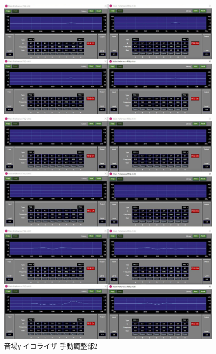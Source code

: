 \documentclass[11pt,a4j]{jreport}
\begin{document}
\begin{figure}[H]
  \begin{minipage}[b]{.5\linewidth}
    \centering
    \includegraphics[width=.9\linewidth]{images/experimentField/afcParameters/03gamma/05manualEQ8.jpg}
  \end{minipage}%
  \begin{minipage}[b]{.5\linewidth}
    \centering
    \includegraphics[width=.9\linewidth]{images/experimentField/afcParameters/03gamma/05manualEQ9.jpg}
  \end{minipage}

  \begin{minipage}[b]{1\linewidth}
    \centering
    \includegraphics[width=.45\linewidth]{images/experimentField/afcParameters/03gamma/05manualEQ10.jpg}
  \end{minipage}

  \centering
  \caption{音場γ イコライザ 手動調整部2}
  \label{fig:gammaイコライザ手動調整部2}
\end{figure}
\end{document}
